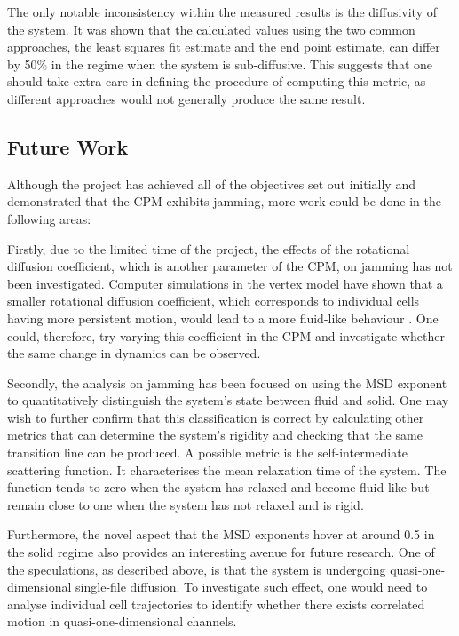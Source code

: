 \documentclass[a4paper,12pt]{article}
\begin{document}
The only notable inconsistency within the measured results is the diffusivity of the system. It was shown that the calculated values using the two common approaches, the least squares fit estimate and the end point estimate, can differ by 50\% in the regime when the system is sub-diffusive. This suggests that one should take extra care in defining the procedure of computing this metric, as different approaches would not generally produce the same result.  


\subsection{Future Work}
Although the project has achieved all of the objectives set out initially and demonstrated that the CPM exhibits jamming, more work could be done in the following areas: 

Firstly, due to the limited time of the project, the effects of the rotational diffusion coefficient, which is another parameter of the CPM, on jamming has not been investigated. Computer simulations in the vertex model have shown that a smaller rotational diffusion coefficient, which corresponds to individual cells having more persistent motion, would lead to a more fluid-like behaviour \cite{bi2015motility}. One could, therefore, try varying this coefficient in the CPM and investigate whether the same change in dynamics can be observed. 

Secondly, the analysis on jamming has been focused on using the MSD exponent to quantitatively distinguish the system's state between fluid and solid. One may wish to further confirm that this classification is correct by calculating other metrics that can determine the system's rigidity and checking that the same transition line can be produced.  A possible metric is the self-intermediate scattering function\cite{hove1954}. It characterises the mean relaxation time of the system. The function tends to zero when the system has relaxed and become fluid-like but remain close to one when the system has not relaxed and is rigid. 

Furthermore, the novel aspect that the MSD exponents hover at around 0.5 in the solid regime also provides an interesting avenue for future research. One of the speculations, as described above, is that the system is undergoing quasi-one-dimensional single-file diffusion. To investigate such effect, one would need to analyse individual cell trajectories to identify whether there exists correlated motion in quasi-one-dimensional channels. \\ \\
\end{document}
